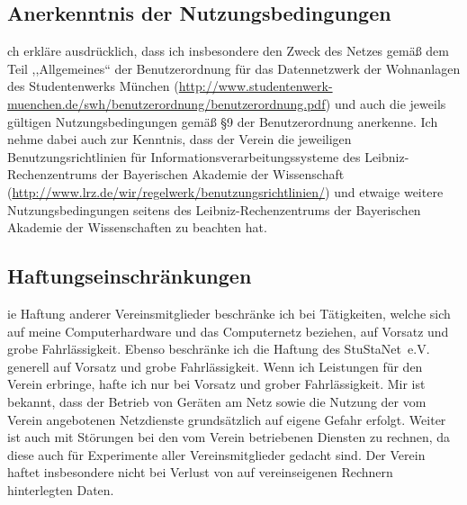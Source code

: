 \documentclass[a4paper,10pt]{scrartcl}
\begin{document}
\subsection*{Anerkenntnis der Nutzungsbedingungen}
ch erkläre ausdrücklich, dass ich insbesondere den Zweck des Netzes gemäß dem Teil ,,Allgemeines`` der Benutzerordnung für das Datennetzwerk der Wohnanlagen des Studentenwerks München (\url{http://www.studentenwerk-muenchen.de/swh/benutzerordnung/benutzerordnung.pdf}) und auch die jeweils gültigen Nutzungsbedingungen gemäß §9 der Benutzerordnung anerkenne. Ich nehme dabei auch zur Kenntnis, dass der Verein die jeweiligen Benutzungsrichtlinien für Informationsverarbeitungssysteme des Leibniz-Rechenzentrums der Bayerischen Akademie der Wissenschaft (\url{http://www.lrz.de/wir/regelwerk/benutzungsrichtlinien/}) und etwaige weitere Nutzungsbedingungen seitens des Leibniz-Rechenzentrums der Bayerischen Akademie der Wissenschaften zu beachten hat.

\subsection*{Haftungseinschränkungen}
ie Haftung anderer Vereinsmitglieder beschränke ich bei Tätigkeiten, welche sich auf meine Computerhardware und das Computernetz beziehen, auf Vorsatz und grobe Fahrlässigkeit. Ebenso beschränke ich die Haftung des StuStaNet~e.V. generell auf Vorsatz und grobe Fahrlässigkeit. Wenn ich Leistungen für den Verein erbringe, hafte ich nur bei Vorsatz und grober Fahrlässigkeit. Mir ist bekannt, dass der Betrieb von Geräten am Netz sowie die Nutzung der vom Verein angebotenen Netzdienste grundsätzlich auf eigene Gefahr erfolgt. Weiter ist auch mit Störungen bei den vom Verein betriebenen Diensten zu rechnen, da diese auch für Experimente aller Vereinsmitglieder gedacht sind. Der Verein haftet insbesondere nicht bei Verlust von auf vereinseigenen Rechnern hinterlegten Daten.
\end{document}
